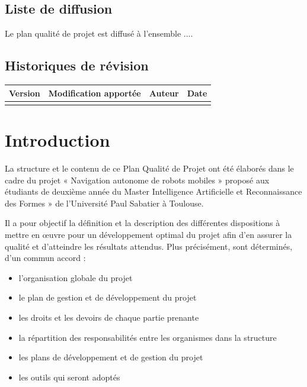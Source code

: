 \documentclass[10pt,a4paper]{article}
\begin{document}
\subsection*{Liste de diffusion}

Le plan qualité de projet est diffusé à l’ensemble .... 

\subsection*{Historiques de révision}

\begin{center}
    \begin{tabular}{| l | l | l | l |}
    \hline
     \rowcolor{gray} Version & Modification apportée & Auteur & Date \\ \hline
    & & & \\
     \hline
    \end{tabular}
\end{center}

\newpage
\tableofcontents
\newpage
	

\section{Introduction}
\label{sec:introduction}

La structure et le contenu de ce Plan Qualité de Projet ont été élaborés dans le cadre du projet « Navigation autonome de robots mobiles » proposé aux étudiants de deuxième année du Master  Intelligence Artificielle et Reconnaissance des Formes » de l'Université Paul Sabatier à Toulouse.

Il a pour objectif la définition et la description des différentes dispositions à mettre en œuvre pour un développement optimal du projet afin d’en assurer la qualité et d’atteindre les résultats attendus. Plus précisément, sont déterminés, d’un commun accord :
\begin{itemize}
\item l’organisation globale du projet 
\item le plan de gestion et de développement du projet
\item les droits et les devoirs de chaque partie prenante
\item la répartition des responsabilités entre les organismes dans la structure
\item les plans de développement et de gestion du projet
\item les outils qui seront adoptés 
\end{itemize}
\end{document}
